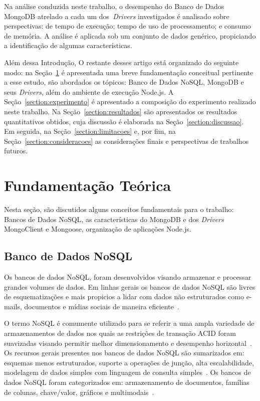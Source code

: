 \documentclass[12pt]{article}
\begin{document}
Na análise conduzida neste trabalho, o desempenho do Banco de Dados MongoDB atrelado a cada um dos~\emph{Drivers} investigados é analisado sobre perspectivas: de tempo de execução; tempo de uso de processamento; e consumo de memória. A análise é aplicada sob um conjunto de dados genérico, propiciando a identificação de algumas características.

Além dessa Introdução, O restante desses artigo está organizado do seguinte modo: na Seção~\ref{section:fundamentacao} é apresentada uma breve fundamentação conceitual pertinente a esse estudo, são abordados os tópicos: Banco de Dados NoSQL, MongoDB e seus \emph{Drivers}, além do ambiente de execução Node.js. A Seção~\ref{section:experimento} é apresentado a composição do experimento realizado neste trabalho. Na Seção~\ref{section:resultados} são apresentados os resultados quantitativos obtidos, cuja discussão é elaborada na Seção~\ref{section:discussao}. Em seguida, na Seção~\ref{section:limitacoes} e, por fim, na Seção~\ref{section:consideracoes} as considerações finais e perspectivas de trabalhos futuros.

\section{Fundamentação Teórica}
\label{section:fundamentacao}

Nesta seção, são discutidos alguns conceitos fundamentais para o trabalho: Bancos de Dados NoSQL, as características do MongoDB e dos \emph{Drivers} MongoClient e Mongoose, organização de aplicações Node.js. 

\subsection{Banco de Dados NoSQL}
\label{subsection:nao-relacional}

Os bancos de dados NoSQL, foram desenvolvidos visando armazenar e processar grandes volumes de dados. Em linhas gerais os bancos de dados NoSQL são livres de esquematizações e mais propicios a lidar com dados não estruturados como e-mails, documentos e mídias sociais de maneira eficiente~\cite{mohamed:2014,ramesh:2016}.

O termo NoSQL é comumente utilizado para se referir a uma ampla variedade de armazenamentos de dados nos quais as restrições de transação ACID foram suavizadas visando permitir melhor dimensionamento e desempenho horizontal~\cite{rafique:2018}. Os recursos gerais presentes nos bancos de dados NoSQL são sumarizados em: esquemas menos estruturados, suporte a operações de junção, alta escalabilidade, modelagem de dados simples com linguagem de consulta simples~\cite{ramesh:2016}. Os bancos de dados NoSQL foram categorizados em: armazenamento de documentos, famílias de colunas, chave/valor, gráficos e multimodais~\cite{aparicio:2016}.
\end{document}
